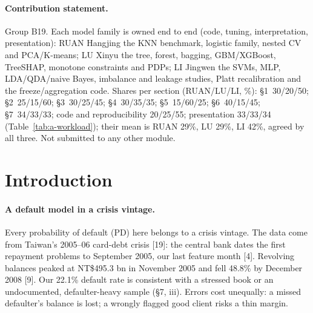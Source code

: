 \begin{abstract}
  Banks use default models as cut-offs, so we judge ranking and
  operating point. On the UCI credit-card data (29,965 cardholders, 22.1\%
  defaulters, drawn as the 2005 card-debt crisis began) we compare ten
  classifiers, choosing everything by training cross-validation (CV) and
  freezing each configuration at its first test scoring. XGBoost, gradient
  boosting and the random forest tie (CV AUC 0.785--0.786; XGBoost test 0.789),
  0.025--0.026 above the logit. Post-freeze training-CV checks show where
  the signal lies: adding September's record to limit and demographics lifts
  XGBoost's AUC from 0.63 to 0.77; a third of the logit's gap is reading
  repayment codes as evenly spaced numbers, most of the rest one-variable curves;
  interactions are small; demographics add 0.002 CV AUC but raise fairness
  issues. Resampling before the split fakes a 0.914 AUC. At an illustrative 5:1, moving the
  logit's cut-off saves 1,937 test cost units; switching to XGBoost saves 145
  more [$-$18, 299].
\end{abstract}

\paragraph{Contribution statement.}
Group B19. Each model family is owned end to end (code, tuning, interpretation, presentation): RUAN Hangjing the KNN benchmark, logistic family, nested CV and PCA/K-means; LU Xinyu the tree, forest, bagging, GBM/XGBoost, TreeSHAP, monotone constraints and PDPs; LI Jingwen the SVMs, MLP, LDA/QDA/naive Bayes, imbalance and leakage studies, Platt recalibration and the freeze/aggregation code. Shares per section (RUAN/LU/LI, \%):
\S1~30/20/50; \S2~25/15/60;
\S3~30/25/45; \S4~30/35/35;
\S5~15/60/25; \S6~40/15/45;
\S7~34/33/33; code and reproducibility
20/25/55; presentation 33/33/34
(Table~\ref{tab:a-workload}); their mean is RUAN 29\%, LU 29\%, LI 42\%, agreed by all three. Not submitted to any other module.

\section{Introduction}

\paragraph{A default model in a crisis vintage.}
Every probability of default (PD) here belongs to a crisis vintage. The data come from Taiwan's 2005--06 card-debt crisis [19]: the central bank dates the first repayment problems to September 2005, our last feature month [4]. Revolving balances peaked at NT\$495.3 bn in November 2005 and fell 48.8\% by December 2008 [9]. Our 22.1\% default rate is consistent with a stressed book or an undocumented, defaulter-heavy sample (\S7, iii). Errors cost unequally: a missed defaulter's balance is lost; a wrongly flagged good client risks a thin margin.

